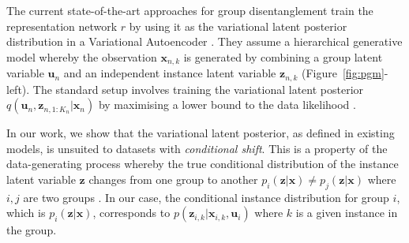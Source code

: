 \documentclass{article} %
\begin{document}
The current state-of-the-art approaches for group disentanglement train the representation network $r$ by using it as the variational latent posterior distribution in a Variational Autoencoder \citep{Bouchacourt2018MultiLevelVA, Hosoya2019GroupbasedLO, Nmeth2020AdversarialDW}. They assume a hierarchical generative model whereby the observation $\mathbf{x}_{n,k}$ is generated by combining a group latent variable $\mathbf{u}_n$ and an independent instance latent variable $\mathbf{z}_{n,k}$ (Figure~\ref{fig:pgm}-left). The standard setup involves training the variational latent posterior $q(\mathbf{u}_n, \mathbf{z}_{n,1:K_n} | \mathbf{x}_n)$ by maximising a lower bound to the data likelihood \citep{Kingma2014AutoEncodingVB, JimenezRezende2014StochasticBA}. 

In our work, we show that the variational latent posterior, as defined in existing models, is unsuited to datasets with \textit{conditional shift}. This is a property of the data-generating process whereby the true conditional distribution of the instance latent variable $\mathbf{z}$ changes from one group to another $p_i(\mathbf{z} | \mathbf{x}) \neq p_j(\mathbf{z} | \mathbf{x})$ where $i,j$ are two groups \citep{Zhang2013DomainAU, Gong2016Domain}. In our case, the conditional instance distribution for group $i$, which is $p_i (\mathbf{z} | \mathbf{x})$, corresponds to $p(\mathbf{z}_{i,k} | \mathbf{x}_{i,k}, \mathbf{u}_i)$ where $k$ is a given instance in the group.
\end{document}
